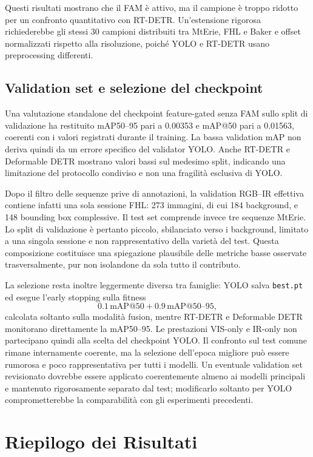 \documentclass[a4paper,11pt]{article}
\begin{document}
Questi risultati mostrano che il FAM è attivo, ma il campione è troppo ridotto per un confronto quantitativo con RT-DETR. Un'estensione rigorosa richiederebbe gli stessi 30 campioni distribuiti tra MtErie, FHL e Baker e offset normalizzati rispetto alla risoluzione, poiché YOLO e RT-DETR usano preprocessing differenti.

\subsection{Validation set e selezione del checkpoint}

Una valutazione standalone del checkpoint feature-gated senza FAM sullo split di validazione ha restituito mAP50--95 pari a 0.00353 e mAP@50 pari a 0.01563, coerenti con i valori registrati durante il training. La bassa validation mAP non deriva quindi da un errore specifico del validator YOLO. Anche RT-DETR e Deformable DETR mostrano valori bassi sul medesimo split, indicando una limitazione del protocollo condiviso e non una fragilità esclusiva di YOLO.

Dopo il filtro delle sequenze prive di annotazioni, la validation RGB--IR effettiva contiene infatti una sola sessione FHL: 273 immagini, di cui 184 background, e 148 bounding box complessive. Il test set comprende invece tre sequenze MtErie. Lo split di validazione è pertanto piccolo, sbilanciato verso i background, limitato a una singola sessione e non rappresentativo della varietà del test. Questa composizione costituisce una spiegazione plausibile delle metriche basse osservate trasversalmente, pur non isolandone da sola tutto il contributo.

La selezione resta inoltre leggermente diversa tra famiglie: YOLO salva \texttt{best.pt} ed esegue l'early stopping sulla fitness
\[
0.1\,\mathrm{mAP@50}+0.9\,\mathrm{mAP@50\text{--}95},
\]
calcolata soltanto sulla modalità fusion, mentre RT-DETR e Deformable DETR monitorano direttamente la mAP50--95. Le prestazioni VIS-only e IR-only non partecipano quindi alla scelta del checkpoint YOLO. Il confronto sul test comune rimane internamente coerente, ma la selezione dell'epoca migliore può essere rumorosa e poco rappresentativa per tutti i modelli. Un eventuale validation set revisionato dovrebbe essere applicato coerentemente almeno ai modelli principali e mantenuto rigorosamente separato dal test; modificarlo soltanto per YOLO comprometterebbe la comparabilità con gli esperimenti precedenti.

\clearpage
\section{Riepilogo dei Risultati}
\end{document}
